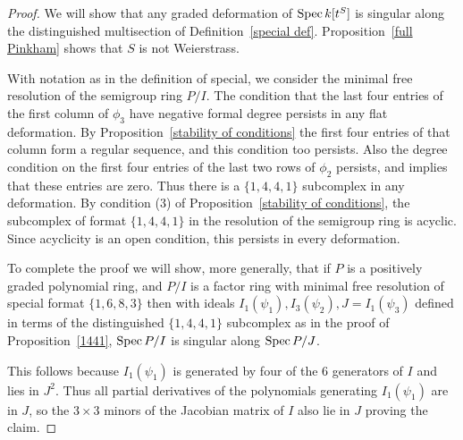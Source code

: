\documentclass[twoside,12pt, leqno]{amsart}
\theoremstyle{definition}
\DeclareMathOperator{\Spec}{{Spec}}
\def\Spec{{{\rm Spec}\,}}
\begin{document}
\begin{proof}  We will show that any graded deformation
of $\Spec k[t^{S}]$ is singular along the distinguished multisection
of Definition~\ref{special def}. Proposition~\ref{full Pinkham}
shows that $S$ is not Weierstrass.

With notation as in the definition of special,
we consider the minimal free resolution of the semigroup ring $P/I$. 
The condition that the last four entries of the first column of $\phi_{3}$ have negative formal degree
persists in any flat deformation. By Proposition~\ref{stability of conditions}
the first four entries of that column form a regular sequence, and this condition too persists.
Also the degree condition on the first four entries of the last two rows of $\phi_{2}$
persists, and implies that these entries are zero. Thus there is a $\{1,4,4,1\}$ subcomplex
in any deformation.  By condition (3) of Proposition~\ref{stability of conditions}, the subcomplex
of format $\{1,4,4,1\}$ in the resolution of the semigroup ring is acyclic. Since acyclicity is an open condition, this persists in every deformation.

To complete the proof we will show,
 more generally,
  that if $P$ is a positively graded polynomial ring, and $P/I$ is a 
 factor ring with minimal free resolution of special format $\{1,6,8,3\}$
 then with ideals $I_{1}(\psi_1), I_{3}(\psi_2), J = I_1(\psi_3)$ defined in terms of the 
 distinguished $\{1,4,4,1\}$ subcomplex as in  the proof of Proposition~\ref{1441}, 
  $\Spec P/I$ is singular along $\Spec P/J$.
  
This follows because
 $I_{1}(\psi_1)$ is generated by four of the 6 generators of $I$ and lies in $J^{2}$.
 Thus all partial derivatives of the polynomials generating $I_{1}(\psi_1)$ are in  $J$, so
 the $3\times 3$ minors 
 of the Jacobian matrix of $I$ also lie in $J$ proving the claim. \end{proof}
\end{document}
